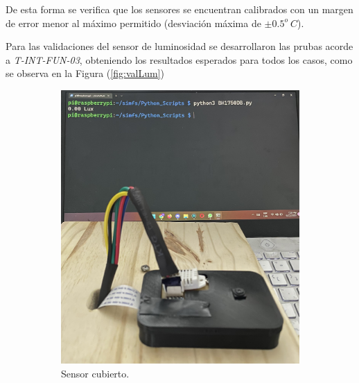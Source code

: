 De esta forma se verifica que los sensores se encuentran calibrados con un margen de error menor al máximo permitido (desviación máxima de $\pm 0.5^o \ C$).

Para las validaciones del sensor de luminosidad se desarrollaron las prubas acorde a \textit{T-INT-FUN-03}, obteniendo los resultados esperados para todos los casos, como se observa en la Figura (\ref{fig:valLum})
\begin{figure}[H]
	\centering
    \begin{subfigure}{0.33\textwidth}
    	\centering
        \includegraphics[width=\linewidth]{ImagenesValidacion del prototipo/TINTFUN3a}
        \caption{Sensor cubierto.}
	\end{subfigure}\hfill
    \begin{subfigure}{0.33\textwidth}
    	\centering

\end{subfigure}
\end{figure}
